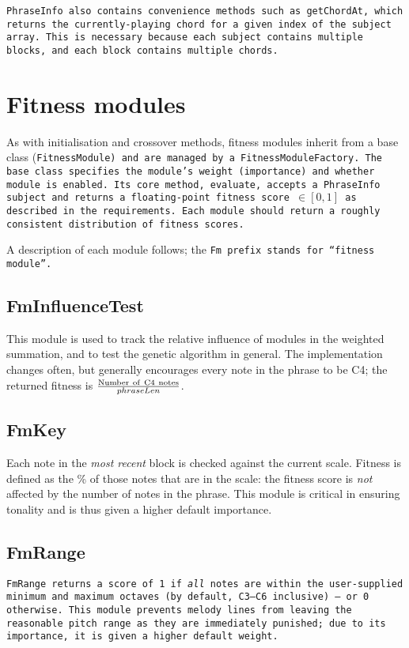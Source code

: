 \tt{PhraseInfo} also contains convenience methods such as \tt{getChordAt}, which returns the currently-playing chord for a given index of the subject array. This is necessary because each subject contains multiple blocks, and each block contains multiple chords.

\section{Fitness modules}

As with initialisation and crossover methods, fitness modules inherit from a base class (\tt{FitnessModule}) and are managed by a \tt{FitnessModuleFactory}. The base class specifies the module's weight (importance) and whether module is enabled. Its core method, \tt{evaluate}, accepts a \tt{PhraseInfo} subject and returns a floating-point fitness score $\in [0,1]$ as described in the requirements. Each module should return a roughly consistent distribution of fitness scores.

A description of each module follows; the \tt{Fm} prefix stands for ``fitness module''.

\subsection{FmInfluenceTest}

This module is used to track the relative influence of modules in the weighted summation, and to test the genetic algorithm in general. The implementation changes often, but generally encourages every note in the phrase to be C4; the returned fitness is $\frac{{\rm Number\ of\ C4\ notes}}{phraseLen}$.

\subsection{FmKey}

Each note in the \emph{most recent} block is checked against the current scale. Fitness is defined as the \% of those notes that are in the scale: the fitness score is \emph{not} affected by the number of notes in the phrase. This module is critical in ensuring tonality and is thus given a higher default importance.

\subsection{FmRange}

\tt{FmRange} returns a score of 1 if \emph{all} notes are within the user-supplied minimum and maximum octaves (by default, C3--C6 inclusive) -- or 0 otherwise. This module prevents melody lines from leaving the reasonable pitch range as they are immediately punished; due to its importance, it is given a higher default weight.

